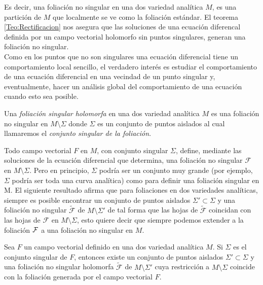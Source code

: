 Es decir, una foliación no singular en una dos variedad analítica $M$, es una partición de $M$ que localmente se ve como la foliación estándar. El teorema \ref{Teo:Rectificacion} nos asegura que las soluciones de una ecuación diferencal definida por un campo vectorial holomorfo sin puntos singulares, generan una foliación no singular.\\

Como en los puntos que no son singulares una ecuación diferencial tiene un comportamiento local sencillo, el verdadero interés es estudiar el comportamiento de una ecuación diferencial en una vecindad de un punto singular y, eventualmente, hacer un análisis global del comportamiento de una ecuación cuando esto sea posible.

\begin{defn}
Una \emph{foliación singular holomorfa} en una dos variedad analítica $M$ es una foliación no singular en $M\setminus\Sigma$ donde $\Sigma$ es un conjunto de puntos aislados al cual llamaremos el \emph{conjunto singular de la foliación}.
\end{defn}

Todo campo vectorial $F$ en $M$, con conjunto singular $\Sigma$, define, mediante las soluciones de la ecuación diferencial que determina,  una foliación no singular $\mathcal{F}$ en $M\setminus\Sigma$. Pero en principio, $\Sigma$ podría ser un conjunto muy grande (por ejemplo, $\Sigma$ podría ser toda una curva analítica) como para definir una foliación singular en M. El siguiente resultado afirma que para foliaciones en dos variedades analíticas, siempre es posible encontrar un conjunto de puntos aislados $\Sigma'\subset\Sigma$ y una foliación no singular $\tilde{\mathcal{F}}$ de $M\setminus\Sigma'$ de tal forma que las hojas de $\tilde{\mathcal{F}}$ coincidan con las hojas de $\mathcal{F}$ en $M\setminus\Sigma$, esto quiere decir que siempre podemos extender a la foliación $\mathcal{F}$ a una foliación no singular en $M$.

\begin{Teorema}
\label{Teo:ExtensionFoliaciones}
\cite{IlyaYako} Sea $F$ un campo vectorial definido en una dos variedad analítica $M$. Si $\Sigma$ es el conjunto singular de $F$, entonces existe un conjunto de puntos aislados $\Sigma'\subset\Sigma$ y una foliación no singular holomorfa $\tilde{\mathcal{F}}$ de $M\setminus\Sigma'$ cuya restricción a $M\setminus\Sigma$ coincide con la foliación generada por el campo vectorial $F$.
\end{Teorema}

